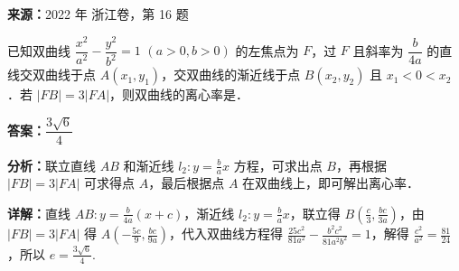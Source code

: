 \begin{question}[points=4]
\textbf{来源：}2022 年 浙江卷，第 16 题\par
已知双曲线 $\dfrac{x^2}{a^2} - \dfrac{y^2}{b^2} = 1$ $(a>0,b>0)$ 的左焦点为 $F$，过 $F$ 且斜率为 $\dfrac{b}{4a}$ 的直线交双曲线于点 $A(x_1,y_1)$，交双曲线的渐近线于点 $B(x_2,y_2)$ 且 $x_1<0<x_2$．若 $|FB| = 3|FA|$，则双曲线的离心率是．
\begin{solution}
\textbf{答案：}$\dfrac{3\sqrt{6}}{4}$

\textbf{分析：}联立直线 $AB$ 和渐近线 $l_2: y=\frac{b}{a}x$ 方程，可求出点 $B$，再根据 $|FB|=3|FA|$ 可求得点 $A$，最后根据点 $A$ 在双曲线上，即可解出离心率．

\textbf{详解：}直线 $AB: y = \frac{b}{4a}(x+c)$，渐近线 $l_2: y = \frac{b}{a}x$，联立得 $B\left(\frac{c}{3},\frac{bc}{3a}\right)$，由 $|FB|=3|FA|$ 得 $A\left(-\frac{5c}{9},\frac{bc}{9a}\right)$，代入双曲线方程得 $\frac{25c^2}{81a^2} - \frac{b^2c^2}{81a^2 b^2} = 1$，解得 $\frac{c^2}{a^2} = \frac{81}{24}$，所以 $e = \frac{3\sqrt{6}}{4}$.
\end{solution}
\end{question}

